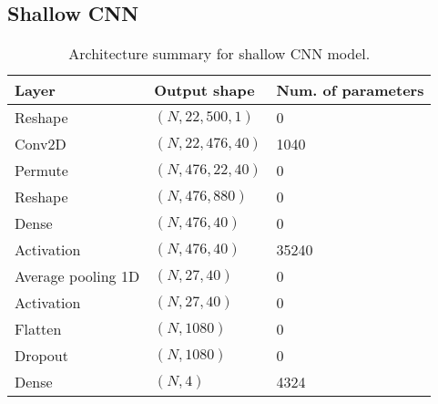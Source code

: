 \documentclass{article}
\begin{document}
\subsection{Shallow CNN}
\begin{table}[ht]
\begin{center}
    \begin{tabular}{|l|l|l|}
        \hline
        Layer   & Output shape  & Num. of parameters \\
        \hline\hline
        Reshape             & $(N, 22, 500, 1)$     & 0     \\
        Conv2D              & $(N, 22, 476, 40)$    & 1040  \\
        Permute             & $(N, 476, 22, 40)$    & 0     \\
        Reshape             & $(N, 476, 880)$       & 0     \\
        Dense               & $(N, 476, 40)$        & 0     \\
        Activation          & $(N, 476, 40)$        & 35240 \\
        Average pooling 1D  & $(N, 27, 40)$         & 0     \\
        Activation          & $(N, 27, 40)$         & 0     \\
        Flatten             & $(N, 1080)$           & 0     \\
        Dropout             & $(N, 1080)$           & 0     \\
        Dense               & $(N, 4)$              & 4324  \\
        \hline
    \end{tabular}
\end{center}
\caption{Architecture summary for shallow CNN model.}
\label{tab:shallow}
\end{table}
\end{document}
